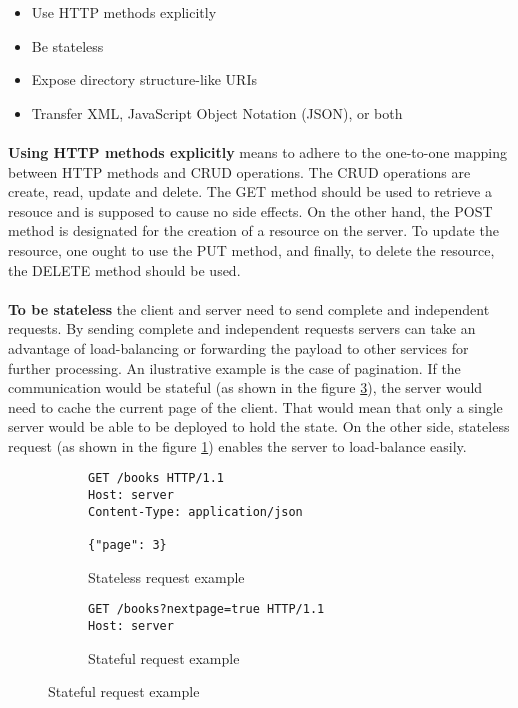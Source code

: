 \begin{itemize}
  \item Use HTTP methods explicitly
  \item Be stateless
  \item Expose directory structure-like URIs
  \item Transfer XML, JavaScript Object Notation (JSON), or both
\end{itemize}

\paragraph{}
\textbf{Using HTTP methods explicitly} means to adhere to the one-to-one mapping between HTTP methods and CRUD operations. The CRUD operations are create, read, update and delete. The GET method should be used to retrieve a resouce and is supposed to cause no side effects. On the other hand, the POST method is designated for the creation of a resource on the server. To update the resource, one ought to use the PUT method, and finally, to delete the resource, the DELETE method should be used.

\paragraph{}
\textbf{To be stateless} the client and server need to send complete and independent requests. By sending complete and independent requests servers can take an advantage of load-balancing or forwarding the payload to other services for further processing. An ilustrative example is the case of pagination. If the communication would be stateful (as shown in the figure \ref{fig:Stateful request example}), the server would need to cache the current page of the client. That would mean that only a single server would be able to be deployed to hold the state. On the other side, stateless request (as shown in the figure \ref{fig:Stateless request example}) enables the server to load-balance easily.

\begin{figure}[h]
  \begin{subfigure}{}
    \begin{minipage}{0.5\textwidth}
      \begin{verbatim}
GET /books HTTP/1.1
Host: server
Content-Type: application/json

{"page": 3}
      \end{verbatim}
      \caption{Stateless request example}
      \label{fig:Stateless request example}
    \end{minipage}
  \end{subfigure}
  \begin{subfigure}{}
    \begin{minipage}{0.5\textwidth}
      \begin{verbatim}
GET /books?nextpage=true HTTP/1.1
Host: server
      \end{verbatim}
      \caption{Stateful request example}
      \label{fig:Stateful request example}
    \end{minipage}
  \end{subfigure}
\end{figure}

